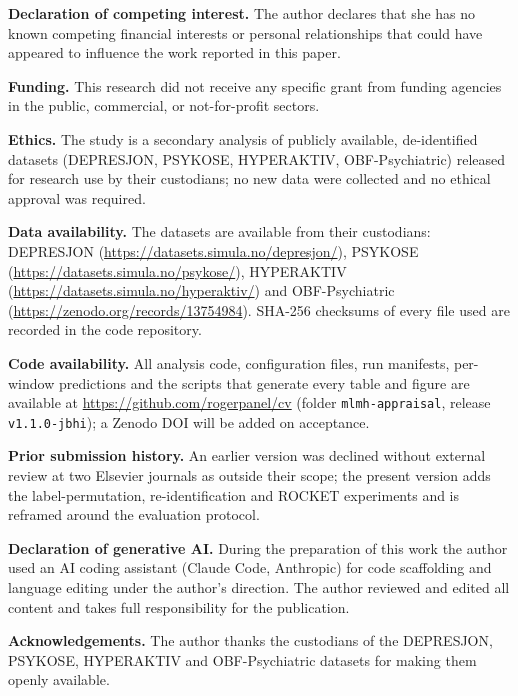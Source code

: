 \documentclass[11pt,a4paper]{article}
\begin{document}
\textbf{Declaration of competing interest.} The author declares that she has no known competing financial interests or personal relationships that could have appeared to influence the work reported in this paper.

\textbf{Funding.} This research did not receive any specific grant from funding agencies in the public, commercial, or not-for-profit sectors.

\textbf{Ethics.} The study is a secondary analysis of publicly available, de-identified datasets (DEPRESJON, PSYKOSE, HYPERAKTIV, OBF-Psychiatric) released for research use by their custodians; no new data were collected and no ethical approval was required.

\textbf{Data availability.} The datasets are available from their custodians: DEPRESJON (\url{https://datasets.simula.no/depresjon/}), PSYKOSE (\url{https://datasets.simula.no/psykose/}), HYPERAKTIV (\url{https://datasets.simula.no/hyperaktiv/}) and OBF-Psychiatric (\url{https://zenodo.org/records/13754984}). SHA-256 checksums of every file used are recorded in the code repository.

\textbf{Code availability.} All analysis code, configuration files, run manifests, per-window predictions and the scripts that generate every table and figure are available at \url{https://github.com/rogerpanel/cv} (folder \texttt{mlmh-appraisal}, release \texttt{v1.1.0-jbhi}); a Zenodo DOI will be added on acceptance.

\textbf{Prior submission history.} An earlier version was declined without external review at two Elsevier journals as outside their scope; the present version adds the label-permutation, re-identification and ROCKET experiments and is reframed around the evaluation protocol.

\textbf{Declaration of generative AI.} During the preparation of this work the author used an AI coding assistant (Claude Code, Anthropic) for code scaffolding and language editing under the author's direction. The author reviewed and edited all content and takes full responsibility for the publication.

\textbf{Acknowledgements.} The author thanks the custodians of the DEPRESJON, PSYKOSE, HYPERAKTIV and OBF-Psychiatric datasets for making them openly available.
\end{document}
